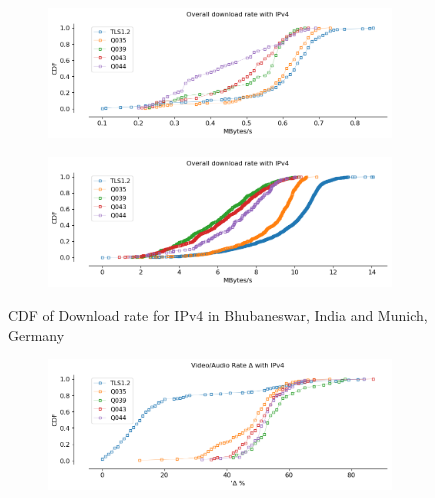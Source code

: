 \begin{frame}

\begin{figure}[!htb]  
    \begin{subfigure}{0.45\textwidth}
        \includegraphics[width=\linewidth]{./plots/youtube/india/graph_download_rate.png}
    \end{subfigure}
    \begin{subfigure}{0.45\textwidth}
        \includegraphics[width=\linewidth]{./plots/youtube/munich/graph_download_rate.png}
    \end{subfigure}    
    \caption{CDF of Download rate for IPv4 in Bhubaneswar, India and Munich, Germany}\label{fig:cdf-of-download}
\end{figure}
%
\begin{figure}[!htb]
    \begin{subfigure}{0.45\textwidth}
        \includegraphics[width=\linewidth]{./plots/youtube/india/graph_rate_diff.png}

\end{subfigure}
\end{figure}
\end{frame}
